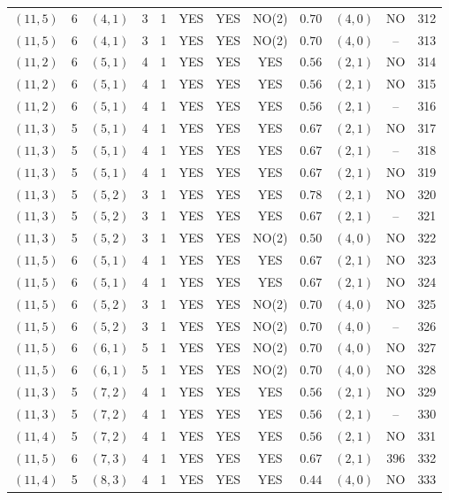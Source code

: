 \begin{longtable}{|c|c|c|c|c|c|c|c|c|c|c|c|}
$(11,5)$ & 6 & $(4,1)$ & 3 & 1 & YES & YES & NO(2) & $0.70$ & $(4,0)$ & NO & 312\\
$(11,5)$ & 6 & $(4,1)$ & 3 & 1 & YES & YES & NO(2) & $0.70$ & $(4,0)$ & -- & 313\\
$(11,2)$ & 6 & $(5,1)$ & 4 & 1 & YES & YES & YES & $0.56$ & $(2,1)$ & NO & 314\\
$(11,2)$ & 6 & $(5,1)$ & 4 & 1 & YES & YES & YES & $0.56$ & $(2,1)$ & NO & 315\\
$(11,2)$ & 6 & $(5,1)$ & 4 & 1 & YES & YES & YES & $0.56$ & $(2,1)$ & -- & 316\\
$(11,3)$ & 5 & $(5,1)$ & 4 & 1 & YES & YES & YES & $0.67$ & $(2,1)$ & NO & 317\\
$(11,3)$ & 5 & $(5,1)$ & 4 & 1 & YES & YES & YES & $0.67$ & $(2,1)$ & -- & 318\\
$(11,3)$ & 5 & $(5,1)$ & 4 & 1 & YES & YES & YES & $0.67$ & $(2,1)$ & NO & 319\\
$(11,3)$ & 5 & $(5,2)$ & 3 & 1 & YES & YES & YES & $0.78$ & $(2,1)$ & NO & 320\\
$(11,3)$ & 5 & $(5,2)$ & 3 & 1 & YES & YES & YES & $0.67$ & $(2,1)$ & -- & 321\\
$(11,3)$ & 5 & $(5,2)$ & 3 & 1 & YES & YES & NO(2) & $0.50$ & $(4,0)$ & NO & 322\\
$(11,5)$ & 6 & $(5,1)$ & 4 & 1 & YES & YES & YES & $0.67$ & $(2,1)$ & NO & 323\\
$(11,5)$ & 6 & $(5,1)$ & 4 & 1 & YES & YES & YES & $0.67$ & $(2,1)$ & NO & 324\\
$(11,5)$ & 6 & $(5,2)$ & 3 & 1 & YES & YES & NO(2) & $0.70$ & $(4,0)$ & NO & 325\\
$(11,5)$ & 6 & $(5,2)$ & 3 & 1 & YES & YES & NO(2) & $0.70$ & $(4,0)$ & -- & 326\\
$(11,5)$ & 6 & $(6,1)$ & 5 & 1 & YES & YES & NO(2) & $0.70$ & $(4,0)$ & NO & 327\\
$(11,5)$ & 6 & $(6,1)$ & 5 & 1 & YES & YES & NO(2) & $0.70$ & $(4,0)$ & NO & 328\\
$(11,3)$ & 5 & $(7,2)$ & 4 & 1 & YES & YES & YES & $0.56$ & $(2,1)$ & NO & 329\\
$(11,3)$ & 5 & $(7,2)$ & 4 & 1 & YES & YES & YES & $0.56$ & $(2,1)$ & -- & 330\\
$(11,4)$ & 5 & $(7,2)$ & 4 & 1 & YES & YES & YES & $0.56$ & $(2,1)$ & NO & 331\\
$(11,5)$ & 6 & $(7,3)$ & 4 & 1 & YES & YES & YES & $0.67$ & $(2,1)$ & 396 & 332\\
$(11,4)$ & 5 & $(8,3)$ & 4 & 1 & YES & YES & YES & $0.44$ & $(4,0)$ & NO & 333\\

\end{longtable}
